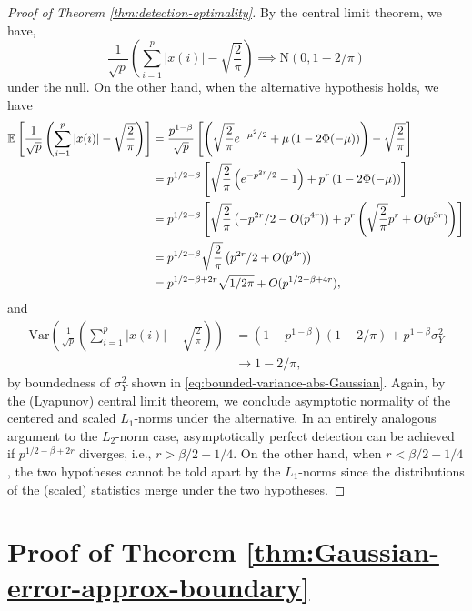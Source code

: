 \begin{proof}[Proof of Theorem \ref{thm:detection-optimality}]
By the central limit theorem, we have,
\begin{equation}
    \frac{1}{\sqrt{p}}\left(\sum_{i=1}^p |x(i)| - \sqrt{\frac{2}{\pi}}\right) \implies \mathrm{N}(0, 1-2/\pi)
\end{equation}
under the null.
On the other hand, when the alternative hypothesis holds, we have
\begin{align*}
    {\mathbb E} \left[ \frac{1}{\sqrt{p}} \left(\sum_{i=1}^p |x(i)| - \sqrt{\frac{2}{\pi}}\right) \right] 
    &= \frac{p^{1-\beta}}{\sqrt{p}}\left[\left(\sqrt{\frac{2}{\pi}}e^{-\mu^2/2} + \mu\left(1-2\Phi(-\mu)\right) \right) - \sqrt{\frac{2}{\pi}} \right] \\
    &= p^{1/2-\beta} \left[\sqrt{\frac{2}{\pi}}\left(e^{-p^{2r}/2} - 1 \right) + p^r\left(1-2\Phi(-\mu)\right) \right] \\
    &= p^{1/2-\beta} \left[\sqrt{\frac{2}{\pi}}\left(-p^{2r}/2 - O(p^{4r})\right) + p^r\left(\sqrt{\frac{2}{\pi}}p^r + O(p^{3r})\right) \right] \\
    &= p^{1/2-\beta} \sqrt{\frac{2}{\pi}} \left(p^{2r}/2 + O(p^{4r}) \right) \\
    &= p^{1/2-\beta+2r} \sqrt{{1}/{2\pi}} + O(p^{1/2-\beta+4r}),
\end{align*}
and 
\begin{align*}
    \mathrm{Var} \left(\frac{1}{\sqrt{p}} \left(\sum_{i=1}^p |x(i)| - \sqrt{\frac{2}{\pi}}\right) \right) 
    & = (1-p^{1-\beta})(1-2/\pi) + p^{1-\beta}\sigma_{Y}^2 \\
    & \to 1-2/\pi,
\end{align*}
by boundedness of $\sigma_{Y}^2$ shown in \eqref{eq:bounded-variance-abs-Gaussian}.
Again, by the (Lyapunov) central limit theorem, we conclude asymptotic normality of the centered and scaled $L_1$-norms under the alternative.
In an entirely analogous argument to the $L_2$-norm case, asymptotically perfect detection can be achieved if $p^{1/2-\beta+2r}$ diverges, i.e., $r>\beta/2-1/4$.
On the other hand, when $r<\beta/2-1/4$, the two hypotheses cannot be told apart by the $L_1$-norms since the distributions of the (scaled) statistics merge under the two hypotheses.
\end{proof}







\section{Proof of Theorem \ref{thm:Gaussian-error-approx-boundary}}
\label{subsec:proof-additive-error-approx-boundaries}

